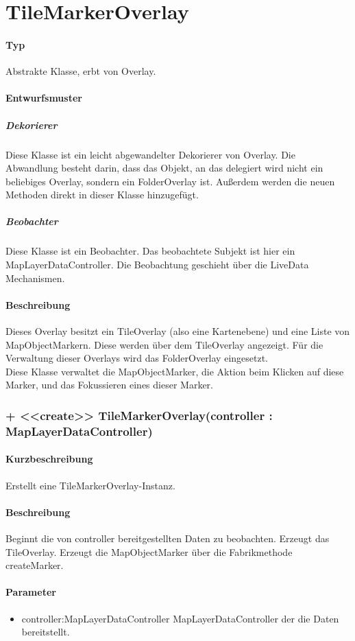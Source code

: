 \section{TileMarkerOverlay}
\paragraph*{Typ} 
Abstrakte Klasse, erbt von Overlay.
\paragraph*{Entwurfsmuster}
\subparagraph*{Dekorierer}
Diese Klasse ist ein leicht abgewandelter Dekorierer von Overlay.
Die Abwandlung besteht darin, dass das Objekt, an das delegiert wird nicht ein
beliebiges Overlay, sondern ein FolderOverlay ist. Außerdem werden die neuen 
Methoden direkt in dieser Klasse hinzugefügt.\\
\subparagraph*{Beobachter}
Diese Klasse ist ein Beobachter. Das beobachtete Subjekt ist hier ein MapLayerDataController.
Die Beobachtung geschieht über die LiveData Mechanismen.
\paragraph*{Beschreibung}
Dieses Overlay besitzt ein TileOverlay (also eine Kartenebene) und eine 
Liste von MapObjectMarkern. Diese werden über dem TileOverlay angezeigt.
Für die Verwaltung dieser Overlays wird das FolderOverlay eingesetzt.\\
Diese Klasse verwaltet die MapObjectMarker, die Aktion beim Klicken auf diese Marker, 
und das Fokussieren eines dieser Marker.

\subsubsection{+ <<create>> TileMarkerOverlay(controller : MapLayerDataController)}%
\paragraph*{Kurzbeschreibung}
Erstellt eine TileMarkerOverlay-Instanz.
\paragraph*{Beschreibung}
Beginnt die von controller bereitgestellten Daten zu beobachten. Erzeugt das TileOverlay.
Erzeugt die MapObjectMarker über die Fabrikmethode createMarker.
\paragraph*{Parameter}
\begin{itemize}
    \item controller:MapLayerDataController MapLayerDataController der die Daten bereitstellt.
\end{itemize}

